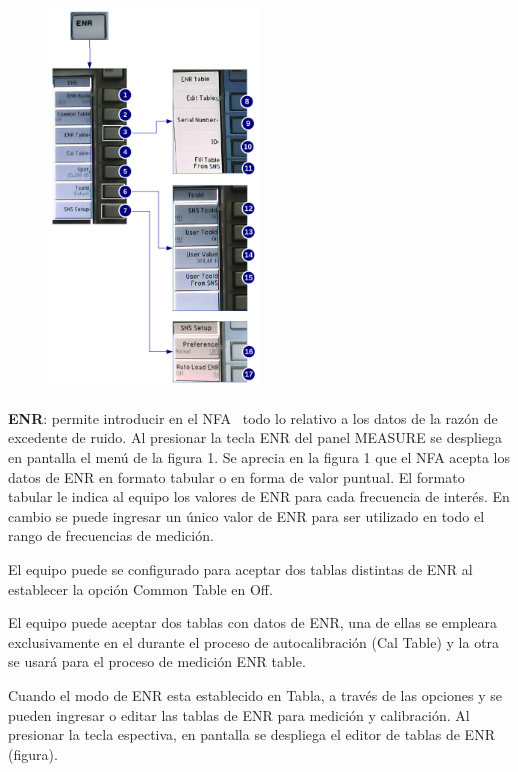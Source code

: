 	\begin{minipage}[t]{\textwidth}
		\begin{figure}
			\includegraphics[width=0.5\textwidth]{./Imagenes/MenuENRN8975A.pdf}		
		\end{figure}
	
		\textbf{ENR}: permite introducir en el NFA \ todo lo relativo a los datos de la razón de excedente de ruido. Al presionar la tecla ENR del panel MEASURE se despliega en pantalla el menú de la figura 1. Se aprecia en la figura 1 que el NFA acepta los datos de ENR en formato tabular o en forma de valor
		puntual. El formato tabular le indica al equipo los valores de ENR para cada frecuencia de interés. En cambio se puede ingresar un único valor de ENR para ser utilizado en todo el rango de frecuencias de medición.	
		
		El equipo puede se configurado para aceptar dos tablas distintas de ENR al establecer la opción Common Table en Off. 
		
		El equipo puede aceptar dos tablas con datos de ENR, una de ellas se empleara exclusivamente en el durante el proceso de autocalibración (Cal Table) y la otra se usará para el proceso de medición ENR table.
		
		Cuando el modo de ENR esta establecido en Tabla, a través de las opciones y se pueden ingresar o editar las tablas de ENR para medición y calibración. Al presionar la tecla  espectiva, en pantalla se despliega el editor de tablas de ENR (figura). 	
		

\end{minipage}
